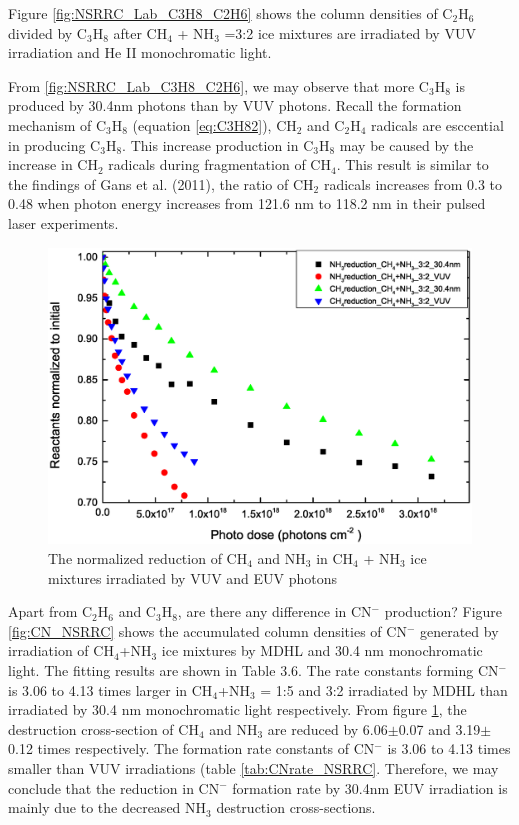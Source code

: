 Figure \ref{fig:NSRRC_Lab_C3H8_C2H6} shows the column densities of C$_2$H$_6$ divided by C$_3$H$_8$ after CH$_4$ + NH$_3$ =3:2 ice mixtures are irradiated by VUV irradiation and He II monochromatic light.

From \ref{fig:NSRRC_Lab_C3H8_C2H6}, we may observe that more C$_3$H$_8$ is produced by 30.4nm photons than by VUV photons. Recall the formation mechanism of C$_3$H$_8$ (equation \ref{eq:C3H82}), CH$_2$ and C$_2$H$_4$ radicals are esccential in producing C$_3$H$_8$. This increase production in C$_3$H$_8$ may be caused by the increase in CH$_2$ radicals during fragmentation of CH$_4$. This result is similar to the findings of Gans et al. (2011)\cite{gans2011photolysis}, the ratio of CH$_2$ radicals increases from 0.3 to 0.48 when photon energy increases from 121.6 nm to 118.2 nm in their pulsed laser experiments.


\begin{figure}
\centering
\includegraphics[width=\textwidth]{figures/chapter3/Reactants_normalized_to_initial.eps}
\caption{The normalized reduction of CH$_4$ and NH$_3$ in CH$_4$ + NH$_3$ ice mixtures irradiated by VUV and EUV photons}
\label{fig:normalized_reactants}
\end{figure}

Apart from C$_2$H$_6$ and C$_3$H$_8$, are there any difference in CN$^-$ production? Figure \ref{fig:CN_NSRRC} shows the accumulated column densities of CN$^-$ generated by irradiation of CH$_4$+NH$_3$ ice mixtures by MDHL and 30.4 nm monochromatic light. The fitting results are shown in Table 3.6. The rate constants forming CN$^-$ is 3.06 to 4.13 times larger in CH$_4$+NH$_3$ = 1:5 and 3:2 irradiated by MDHL than irradiated by 30.4 nm monochromatic light respectively. From figure \ref{fig:normalized_reactants}, the destruction cross-section of CH$_4$ and NH$_3$ are reduced by 6.06$\pm$0.07 and 3.19$\pm$0.12 times respectively. The formation rate constants of CN$^-$ is 3.06 to 4.13 times smaller than VUV irradiations (table \ref{tab:CNrate_NSRRC}. Therefore, we may conclude that the reduction in CN$^-$ formation rate by 30.4nm EUV irradiation is mainly due to the decreased NH$_3$ destruction cross-sections.


